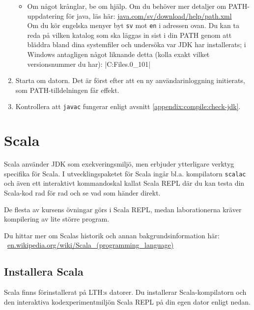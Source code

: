 \begin{enumerate}
\begin{itemize}
\item Om något krånglar, be om hjälp. Om du behöver mer detaljer om PATH-uppdatering för java, läs här:  \href{https://java.com/sv/download/help/path.xml}{java.com/sv/download/help/path.xml} \\
Om du kör engelska menyer byt \texttt{sv} mot \texttt{en} i adressen ovan.  Du kan ta reda på vilken katalog som ska läggas in sist i din PATH genom att bläddra bland dina systemfiler och undersöka var JDK har installerats; i Windows antagligen något liknande detta (kolla exakt vilket versionsnummer du har): \code|C:\Program Files\Java{}.0_101\bin|
\end{itemize}

\item Starta om datorn. Det är först efter att en ny användarinloggning initierats, som PATH-tilldelningen får effekt.

\item Kontrollera att \texttt{javac} fungerar enligt avsnitt \ref{appendix:compile:check-jdk}.
\end{enumerate}


\section{Scala}

Scala använder JDK som exekveringsmiljö, men erbjuder ytterligare verktyg specifika för Scala. I utvecklingspaketet för Scala ingår bl.a. kompilatorn \texttt{scalac} och även ett interaktivt kommandoskal kallat Scala REPL där du kan testa din Scala-kod rad för rad och se vad som händer direkt. 

De flesta av kursens övningar görs i Scala REPL, medan laborationerna kräver kompilering av lite större program.

Du hittar mer om Scalas historik och annan bakgrundsinformation här: \mbox{%
 \href{https://en.wikipedia.org/wiki/Scala_(programming_language)}{en.wikipedia.org/wiki/Scala\_(programming\_language)}
}

\subsection{Installera Scala}

Scala finns förinstallerat på LTH:s datorer. Du installerar Scala-kompilatorn och den interaktiva kodexperimentmiljön Scala REPL på din egen dator enligt nedan. 

